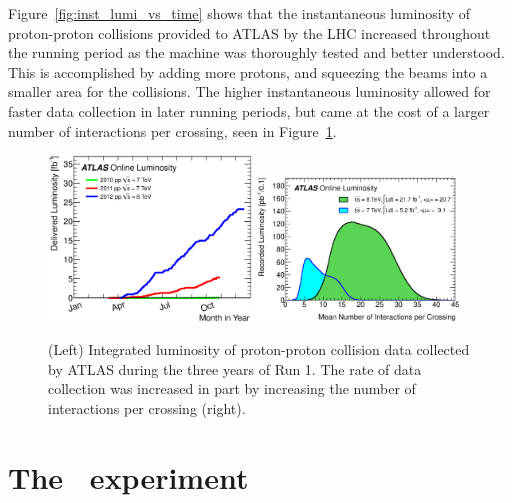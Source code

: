 Figure~\ref{fig:inst_lumi_vs_time} shows that the instantaneous luminosity of
proton-proton collisions provided to ATLAS by the LHC increased throughout the
running period as the machine was thoroughly tested and better understood.
This is accomplished by adding more protons, and squeezing the beams into
a smaller area for the collisions.
The higher instantaneous luminosity allowed for faster data collection in later
running periods, but came at the cost of a larger number of interactions per
crossing, seen in Figure~\ref{fig:int_lumi_vs_time_and_pileup}.

\begin{figure}[th]
  \centering
  \includegraphics[width=0.48\textwidth]{figs/lhc/intlumivsyear.eps}
  \includegraphics[width=0.48\textwidth]{figs/lhc/mu_2011_2012-dec.eps}
  \caption{
    (Left) Integrated luminosity of proton-proton collision data collected by
    ATLAS during the three years of Run 1.
    The rate of data collection was increased in part by increasing the number
    of interactions per crossing (right).
  }
  \label{fig:int_lumi_vs_time_and_pileup}
\end{figure}


\section{The \atlas\ experiment}

